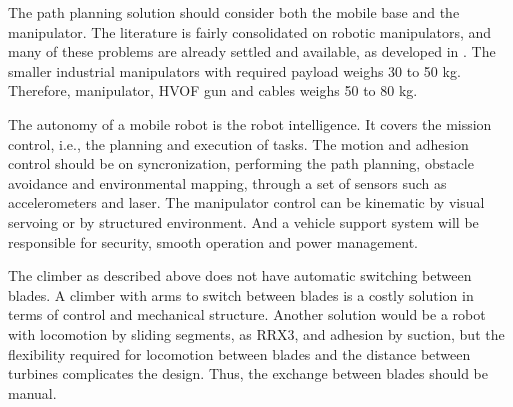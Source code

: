 The path planning solution should consider both the mobile base and the
manipulator. The literature is fairly consolidated on robotic manipulators, and
many of these problems are already settled and available, as developed in
\cite{manzdevelopment}. The smaller industrial manipulators with required
payload weighs 30 to 50 kg. Therefore, manipulator, HVOF gun and cables weighs
50 to 80 kg.



The autonomy of a mobile robot is the robot intelligence. It covers the mission
control, i.e., the planning and execution of tasks. The motion and adhesion
control should be on syncronization, performing the path planning, obstacle
avoidance and environmental mapping, through a set of sensors such as
accelerometers and laser. The manipulator control can be kinematic by visual
servoing or by structured environment. And a vehicle support system will be
responsible for security, smooth operation and power management.



The climber as described above does not have automatic switching between blades.
A climber with arms to switch between blades is a costly solution in terms
of control and mechanical structure. Another solution would be a robot with
locomotion by sliding segments, as RRX3, and adhesion by suction, but the
flexibility required for locomotion between blades and the distance between
turbines complicates the design. Thus, the exchange between blades should be
manual.

